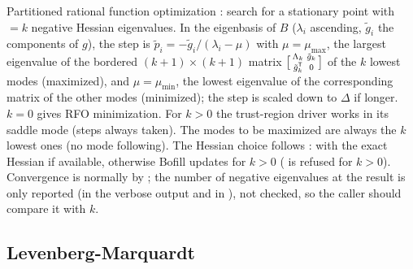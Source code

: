 Partitioned rational function optimization \cite{optimize:banerjee1985,optimize:baker1986}: search for a stationary point with
$=k$ negative Hessian eigenvalues. In the eigenbasis of $B$ ($\lambda_i$ ascending, $\tilde g_i$ the
components of $g$), the step is $\tilde p_i=-\tilde g_i/(\lambda_i-\mu)$ with $\mu=\mu_{\max}$, the largest eigenvalue of the
bordered $(k+1)\times(k+1)$ matrix $\bigl[\begin{smallmatrix}\Lambda_k&\tilde g_k\\ \tilde g_k^{\mathsf T}&0\end{smallmatrix}\bigr]$ of
the $k$ lowest modes (maximized), and $\mu=\mu_{\min}$, the lowest eigenvalue of the corresponding matrix of the other modes
(minimized); the step is scaled down to $\Delta$ if longer. $k=0$ gives RFO minimization. For $k>0$ the trust-region driver works
in its saddle mode (steps always taken). The modes to be maximized are always the $k$ lowest ones (no mode following).
The Hessian choice follows : with  the exact Hessian if available, otherwise Bofill updates for
$k>0$ ( is refused for $k>0$). Convergence is normally by ; the number of negative eigenvalues at
the result is only reported (in the verbose output and in ), not checked, so the caller should
compare it with $k$.
\begin{lareference}
\end{lareference}

\subsection{Levenberg-Marquardt}

